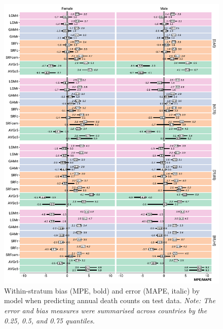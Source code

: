 \documentclass[12pt]{article}
\begin{document}
\begin{appendix}
\begin{figure}
  \caption{Within-stratum bias (MPE, bold) and error (MAPE, italic) by model when predicting annual death counts on test data. \emph{Note: The error and bias measures were summarised across countries by the 0.25, 0.5, and 0.75 quantiles.}}
  \label{fig:errorbiasstrata}
  \includegraphics{errorbias_strata.pdf}
\end{figure}

\end{appendix}
\end{document}
